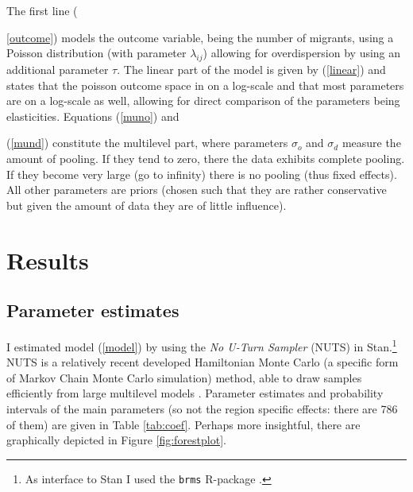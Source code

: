 \documentclass[fleqn,10pt]{SelfArx} %
\begin{document}
        The first line ({\ref{outcome}) models the outcome variable,
          being the number of migrants, using a Poisson distribution
          (with parameter $\lambda_{ij}$) allowing for overdispersion
          by using an additional parameter $\tau$. The linear part of
          the model is given by (\ref{linear}) and states that the
          poisson outcome space in on a log-scale and that most
          parameters are on a log-scale as well, allowing for direct
          comparison of the parameters being elasticities. Equations
          (\ref{muno}) and {(\ref{mund}) constitute the multilevel
            part, where parameters $\sigma_o$ and $\sigma_d$ measure
            the amount of pooling. If they tend to zero, there the
            data exhibits complete pooling. If they become very large
            (go to infinity) there is no pooling (thus fixed
            effects). All other parameters are priors (chosen such
            that they are rather conservative but given the amount of
            data they are of little influence).
          
        \section{Results}

        \subsection{Parameter estimates}
        
        I estimated model (\ref{model}) by using the \emph{No U-Turn
          Sampler} (NUTS) in Stan.\footnote{As interface to Stan
          \citep[see for an overview article of
          Stan][]{carpenter2017stan} I used the \texttt{brms}
          R-package \citep{brms}.} NUTS is a relatively recent
        developed Hamiltonian Monte Carlo (a specific form of Markov
        Chain Monte Carlo simulation) method, able to draw samples
        efficiently from large multilevel models
        \citep{hoffman2014no}. Parameter estimates and probability
        intervals of the main parameters (so not the region specific
        effects: there are 786 of them) are given in Table
        \ref{tab:coef}. Perhaps more insightful, there are graphically
        depicted in Figure \ref{fig:forestplot}.

}}
\end{document}
